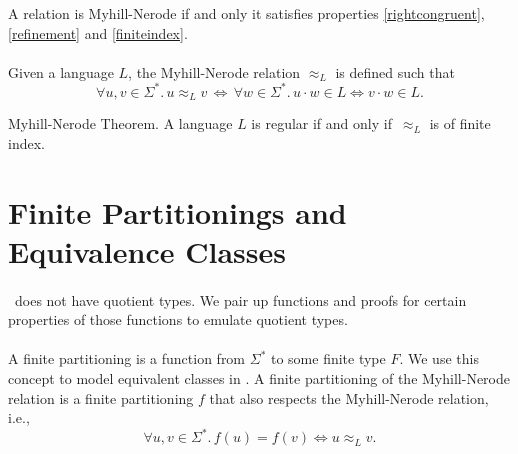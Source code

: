\begin{definition}
    \label{MN_relation}
    A relation is Myhill-Nerode if and only it satisfies properties \ref{rightcongruent}, \ref{refinement} and \ref{finiteindex}.
\end{definition}


\paragraph{} Given a language $L$, the Myhill-Nerode relation $\approx_L$ is defined such that 
\begin{equation*}
    \forall u, v \in \Sigma^*. \,
    u \approx_L v \, \Longleftrightarrow \, 
    \forall w \in \Sigma^*.\, u \cdot w \in L \Leftrightarrow v \cdot w \in L.
\end{equation*}


\begin{theorem}{Myhill-Nerode Theorem.}
    \label{MN}
    A language $L$ is regular if and only if $\,\approx_L$ is of finite index.
\end{theorem}

\section{Finite Partitionings and Equivalence Classes}

\paragraph{}
\coq\ does not have quotient types. 
We pair up functions and proofs for certain properties of those functions to emulate quotient types.

\paragraph{} 
A finite partitioning is a function from $\Sigma^*$ to some finite type $F$. 
We use this concept to model equivalent classes in \coq. 
A finite partitioning of the Myhill-Nerode relation is a finite partitioning $f$ that also respects the Myhill-Nerode relation, i.e.,
\begin{equation*}
    \forall u, v \in \Sigma^*. \,
    f(u) = f(v) \Leftrightarrow u \approx_L v.
\end{equation*}


